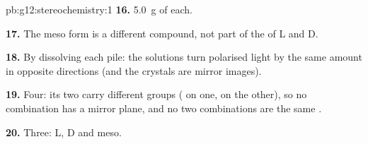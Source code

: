 \begin{solution}{pb:g12:stereochemistry:1}
\textbf{16.} \qty{5.0}{g} of each.

\textbf{17.} The meso form is a different compound, not part of the
 of L and D.

\textbf{18.} By dissolving each pile: the solutions turn polarised light
by the same amount in opposite directions (and the crystals are mirror
images).

\textbf{19.} Four: its two  carry different groups
( on one,  on the other), so no combination has a mirror
plane, and no two combinations are the same .

\textbf{20.} Three: L, D and meso.
\end{solution}

